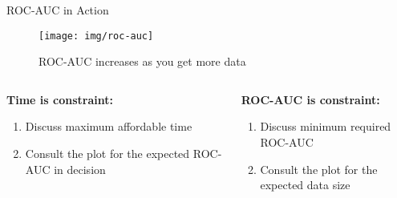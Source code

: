 \documentclass{beamer}
\begin{document}
\begin{frame}{ROC-AUC in Action}
    \begin{figure}
        \centering
        \texttt{[image: img/roc-auc]}
        \caption{ROC-AUC increases as you get more data}
    \end{figure}
    \begin{columns}
    \begin{column}{0.5\linewidth}
    \textbf{Time is constraint:}
    \begin{enumerate}
        \item Discuss maximum affordable time
        \item Consult the plot for the expected ROC-AUC in decision
    \end{enumerate}
    \end{column}
    \begin{column}{0.5\linewidth}
    \textbf{ROC-AUC is constraint:}
    \begin{enumerate}
        \item Discuss minimum required ROC-AUC
        \item Consult the plot for the expected data size
    \end{enumerate}
    \end{column}
    \end{columns}
\end{frame}
\end{document}
